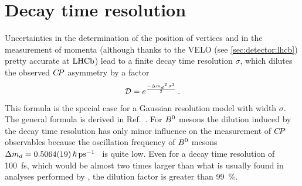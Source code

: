 \section{Decay time resolution}
\label{sec:dataanalysis:resolution}

Uncertainties in the determination of the position of vertices and in the
measurement of momenta (although thanks to the VELO (see
\cref{sec:detector:lhcb}) pretty accurate  at $\lhcb$) lead to a finite decay
time resolution $\sigma$, which dilutes the observed $\CP$ asymmetry by a
factor
\begin{align}
  \mathcal{D} = e^{\frac{-\dmd^2\,\sigma^2}{2}} \, .
\label{eq:dataanalysis:resolution:dilution}
\end{align}
This formula is the special case for a Gaussian resolution model with width
$\sigma$. The general formula is derived in
Ref.~\cite{ResolutionDilutionFactor}. For $\Bd$ mesons the dilution induced by
the decay time resolution has only minor influence on the measurement of $\CP$
observables because the oscillation frequency of $\Bd$ mesons $\dmd =
\SI{0.5064\pm0.0019}{\hbar\invps}$~\cite{PDG2016} is quite low. Even for a decay time
resolution of \SI{100}{\fs}, which would be almost two times larger than what
is usually found in analyses performed by \lhcb, the dilution factor is
greater than \SI{99}{\percent}.